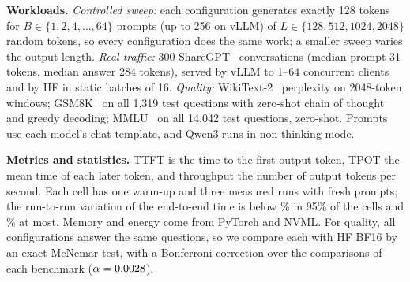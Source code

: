 \textbf{Workloads.} \emph{Controlled sweep:} each configuration generates exactly 128 tokens for
$B\in\{1,2,4,\dots,64\}$ prompts (up to 256 on vLLM) of $L\in\{128,512,1024,2048\}$ random tokens,
so every configuration does the same work; a smaller sweep varies the output length. \emph{Real traffic:} 300 ShareGPT~\cite{sharegpt} conversations (median prompt 31 tokens,
median answer 284 tokens), served by vLLM to 1--64 concurrent clients and by HF in static batches of
16. \emph{Quality:} WikiText-2~\cite{merity2017wikitext} perplexity on 2048-token windows;
GSM8K~\cite{cobbe2021gsm8k} on all 1,319 test questions with zero-shot chain of thought and greedy
decoding; MMLU~\cite{hendrycks2021mmlu} on all 14,042 test questions, zero-shot. Prompts use each
model's chat template, and Qwen3 runs in non-thinking mode.

\textbf{Metrics and statistics.} TTFT is the time to the first output token, TPOT the mean time of
each later token, and throughput the number of output tokens per second. Each cell has one warm-up and
three measured runs with fresh prompts; the run-to-run variation of the end-to-end time is below
\CVmax\% in 95\% of the cells and \CVabsmax\% at most. Memory and energy come from PyTorch and NVML. For quality, all configurations answer the same
questions, so we compare each with HF BF16 by an exact McNemar test, with a Bonferroni correction over
the \MNumTests{} comparisons of each benchmark ($\alpha=0.0028$).
